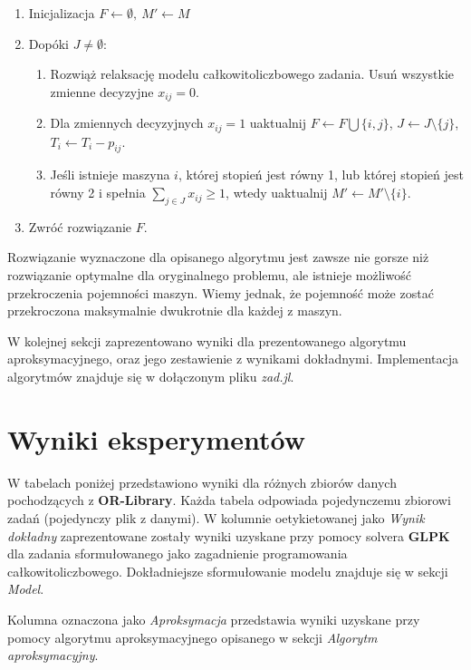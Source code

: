 \documentclass{article}
\begin{document}
    \begin{enumerate}
        \item Inicjalizacja $F \gets \emptyset, \ M' \gets M$
        \item Dopóki $J \neq \emptyset$:
            \begin{enumerate}
                \item Rozwiąż relaksację modelu całkowitoliczbowego zadania. Usuń wszystkie zmienne decyzyjne $x_{ij} = 0$.
                \item Dla zmiennych decyzyjnych $x_{ij} = 1$ uaktualnij $F \gets F \bigcup \{i, j\}$, $J \gets J \setminus \{j\}$, $T_i \gets T_i - p_{ij}$.
                \item Jeśli istnieje maszyna $i$, której stopień jest równy 1, lub której stopień jest równy 2 i spełnia $\sum_{j \in J} x_{ij} \geq 1$, 
                    wtedy uaktualnij $M' \gets M' \setminus \{i\}$.
            \end{enumerate}
        \item Zwróć rozwiązanie $F$.
    \end{enumerate}

    Rozwiązanie wyznaczone dla opisanego algorytmu jest zawsze nie gorsze niż rozwiązanie optymalne dla oryginalnego problemu, ale 
    istnieje możliwość przekroczenia pojemności maszyn. Wiemy jednak, że pojemność może zostać przekroczona maksymalnie dwukrotnie dla każdej 
    z maszyn.

    W kolejnej sekcji zaprezentowano wyniki dla prezentowanego algorytmu aproksymacyjnego, oraz jego zestawienie z wynikami dokładnymi.
    Implementacja algorytmów znajduje się w dołączonym pliku \textit{zad.jl}.

    \section{Wyniki eksperymentów}

    W tabelach poniżej przedstawiono wyniki dla różnych zbiorów danych pochodzących z \textbf{OR-Library}. Każda tabela odpowiada pojedynczemu 
    zbiorowi zadań (pojedynczy plik z danymi). W kolumnie oetykietowanej jako \textit{Wynik dokładny} zaprezentowane zostały wyniki 
    uzyskane przy pomocy solvera \textbf{GLPK} dla zadania sformułowanego jako zagadnienie programowania całkowitoliczbowego. Dokładniejsze sformułowanie 
    modelu znajduje się w sekcji \textit{Model}. 

    Kolumna oznaczona jako \textit{Aproksymacja} przedstawia wyniki uzyskane przy pomocy algorytmu aproksymacyjnego opisanego w sekcji 
    \textit{Algorytm aproksymacyjny}.
\end{document}
